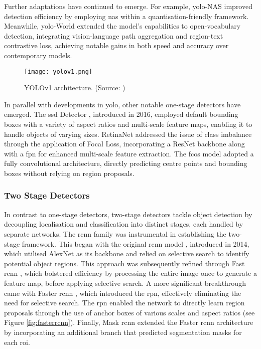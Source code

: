 Further adaptations have continued to emerge. For example, \gls{yolo}-NAS \cite{yolonas} improved detection efficiency by employing \gls{nas} within a quantisation-friendly framework. Meanwhile, \gls{yolo}-World \cite{yoloworld} extended the model’s capabilities to open-vocabulary detection, integrating vision-language path aggregation and region-text contrastive loss, achieving notable gains in both speed and accuracy over contemporary models.

\begin{figure}[ht]
    \centering
    \texttt{[image: yolov1.png]}
    \caption{YOLOv1 architecture. (Source: \cite{yolo})}
    \label{fig:yolov1}
\end{figure}

In parallel with developments in \gls{yolo}, other notable one-stage detectors have emerged. The \gls{ssd} Detector \cite{ssd}, introduced in 2016, employed default bounding boxes with a variety of aspect ratios and multi-scale feature maps, enabling it to handle objects of varying sizes. RetinaNet \cite{retinanet} addressed the issue of class imbalance through the application of Focal Loss, incorporating a ResNet backbone along with a \gls{fpn} \cite{fpn} for enhanced multi-scale feature extraction. The \gls{fcos} model  \cite{fcos} adopted a fully convolutional architecture, directly predicting centre points and bounding boxes without relying on region proposals.

\subsubsection{Two Stage Detectors}
\label{subsubsec:2_twostage}

In contrast to one-stage detectors, two-stage detectors tackle object detection by decoupling localisation and classification into distinct stages, each handled by separate networks.
The \gls{rcnn} family was instrumental in establishing the two-stage framework. This began with the original \gls{rcnn} model \cite{rcnn}, introduced in 2014, which utilised AlexNet \cite{alexnet} as its backbone and relied on selective search to identify potential object regions. This approach was subsequently refined through Fast \gls{rcnn} \cite{fastrcnn}, which bolstered efficiency by processing the entire image once to generate a feature map, before applying selective search. A more significant breakthrough came with Faster \gls{rcnn} \cite{fasterrcnn}, which introduced the \gls{rpn}, effectively eliminating the need for selective search. The \gls{rpn} enabled the network to directly learn region proposals through the use of anchor boxes of various scales and aspect ratios (see Figure \ref{fig:fasterrcnn}). Finally, Mask \gls{rcnn} \cite{maskrcnn} extended the Faster \gls{rcnn} architecture by incorporating an additional branch that predicted segmentation masks for each \gls{roi}.

